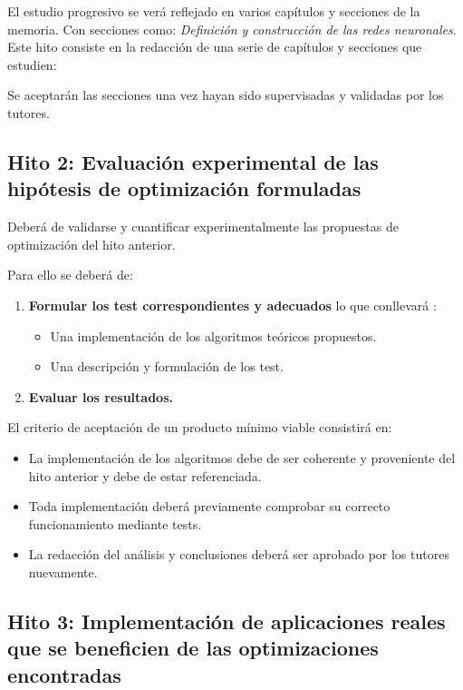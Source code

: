 El estudio progresivo se verá reflejado en varios capítulos y secciones de la memoria. Con secciones como: 
\textit{Definición  y construcción de las redes neuronales}. 
Este hito consiste en la redacción de una serie de capítulos y secciones 
que estudien: 

Se aceptarán las secciones una vez hayan sido supervisadas y validadas por los tutores. 

\subsection*{Hito 2: Evaluación experimental de las hipótesis de optimización formuladas}

Deberá de validarse y cuantificar experimentalmente las propuestas de optimización del hito anterior. 

Para ello  se deberá de: 
\begin{enumerate}
    \item \textbf{Formular los test correspondientes y adecuados} lo que conllevará : 
    \begin{itemize}
        \item Una implementación de los algoritmos teóricos propuestos.
        \item Una descripción y formulación de los test.
    \end{itemize}

    \item \textbf{Evaluar los resultados.}
\end{enumerate}

El criterio de aceptación de un producto mínimo viable consistirá en:
\begin{itemize}
    \item La implementación de los algoritmos debe de ser coherente y proveniente del hito anterior y debe de estar referenciada.
    \item  Toda implementación deberá previamente comprobar su correcto funcionamiento mediante tests.
    \item La redacción del análisis y conclusiones deberá ser aprobado por los tutores nuevamente.
\end{itemize}

\subsection*{Hito 3: Implementación de aplicaciones reales que se beneficien de las optimizaciones encontradas }

